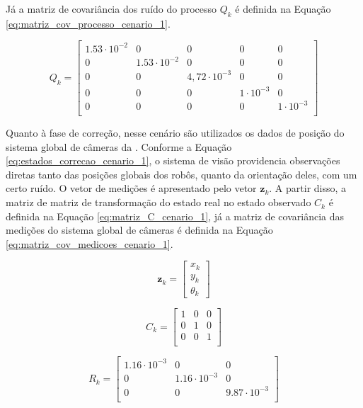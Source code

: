 \documentclass[acronym, symbols, table]{fei}
\begin{document}
		 	Já a matriz de covariância dos ruído do processo $Q_{k}$ é definida na Equação \ref{eq:matriz_cov_processo_cenario_1}.
		 	
		 	\begin{equation}\label{eq:matriz_cov_processo_cenario_1}
		 		Q_{k} = \begin{bmatrix}
		 			1.53\cdot10^{-2} & 0 & 0 & 0 & 0 \\
		 			0 & 1.53\cdot10^{-2} & 0 & 0 & 0 \\
		 			0 & 0 & 4,72\cdot10^{-3} & 0 & 0 \\
		 			0 & 0 & 0 & 1\cdot10^{-3} & 0 \\
		 			0 & 0 & 0 & 0 & 1\cdot10^{-3} \\
		 		\end{bmatrix}
		 	\end{equation}
		 
			 Quanto à fase de correção, nesse cenário são utilizados os dados de posição do sistema global de câmeras da . Conforme a Equação \ref{eq:estados_correcao_cenario_1}, o sistema de visão providencia observações diretas tanto das posições globais dos robôs, quanto da orientação deles, com um certo ruído. O vetor de medições é apresentado pelo vetor $\textbf{z}_k$. A partir disso, a matriz de matriz de transformação do estado real no estado observado $C_k$ é definida na Equação \ref{eq:matriz_C_cenario_1}, já a matriz de covariância das medições do sistema global de câmeras é definida na Equação \ref{eq:matriz_cov_medicoes_cenario_1}.
			 
	 		\begin{equation}\label{eq:estados_correcao_cenario_1}
			 	\textbf{z}_k  = 
			 	\begin{bmatrix}
			 		x_k \\
			 		y_k \\
			 		\theta_k
			 	\end{bmatrix}
			 \end{equation}
			 
			\begin{equation}\label{eq:matriz_C_cenario_1}
			 	C_{k} = \begin{bmatrix}
			 		1 & 0 & 0 \\
			 		0 & 1 & 0 \\
			 		0 & 0 & 1 \\
			 	\end{bmatrix}
		 	\end{equation}
	 	
	 		\begin{equation} \label{eq:matriz_cov_medicoes_cenario_1}
	 			R_{k} = \begin{bmatrix}
	 				1.16\cdot10^{-3} & 0 & 0 \\
	 				0 & 1.16\cdot10^{-3} & 0 \\
	 				0 & 0 & 9.87\cdot10^{-3} \\
	 			\end{bmatrix}
	 		\end{equation}
		
\end{document}
